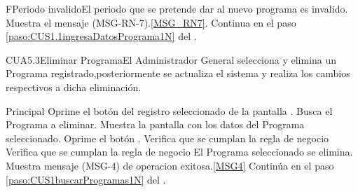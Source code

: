 	\begin{UCtrayectoriaA}{F}{Periodo invalido}{El periodo que se pretende dar al nuevo programa es invalido.}
		\UCpaso Muestra el mensaje (MSG-RN-7).\ref{MSG_RN7}.
		\UCpaso Continua en el paso \ref{paso:CUS1.1ingresaDatosPrograma1N} del .
	\end{UCtrayectoriaA}

	\begin{UseCase}{CUA5.3}{Eliminar Programa}{El Administrador General selecciona y elimina un Programa registrado,posteriormente se actualiza el sistema y realiza los cambios respectivos a dicha eliminación.}
	\end{UseCase}

	\begin{UCtrayectoria}{Principal}
                        \UCpaso[\UCactor] Oprime el bot\'on  del registro seleccionado de la pantalla .
                        \UCpaso [\UCactor] Busca el Programa a eliminar.
			\UCpaso Muestra la pantalla  con los datos del Programa seleccionado.
			\UCpaso [\UCactor] Oprime el bot\'on . 
                        \UCpaso Verifica que se cumplan la regla de negocio  
			\UCpaso Verifica que se cumplan la regla de negocio  
			\UCpaso El Programa seleccionado se elimina.
                        \UCpaso Muestra mensaje (MSG-4) de operacion exitosa.\ref{MSG4}
			\UCpaso Contin\'ua en el paso \ref{paso:CUS1buscarProgramas1N} del .
	\end{UCtrayectoria}


